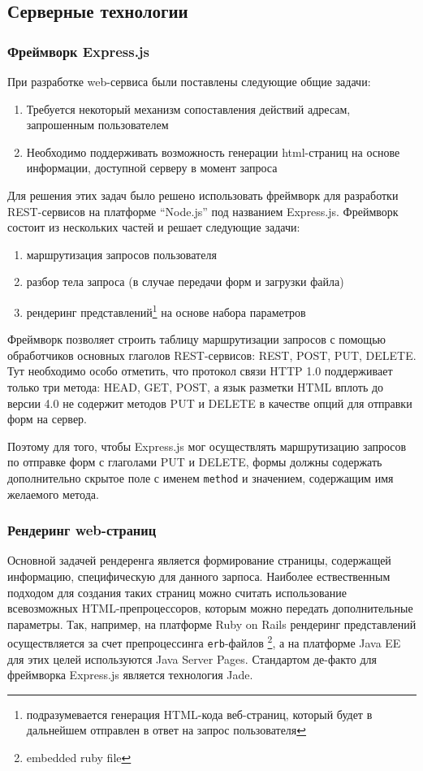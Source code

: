 \documentclass[12pt, a4paper]{article}
\begin{document}
\subsection{Серверные технологии}

\subsubsection{Фреймворк Express.js}
При разработке web-сервиса были поставлены следующие общие задачи:
\begin{enumerate}
    \item Требуется некоторый механизм сопоставления действий адресам, запрошенным
    пользователем
    \item Необходимо поддерживать возможность генерации html-страниц на основе
    информации, доступной серверу в момент запроса
\end{enumerate}

Для решения этих задач было решено использовать фреймворк для разработки
REST-сервисов на платформе ``Node.js'' под названием Express.js. Фреймворк состоит
из нескольких частей и решает следующие задачи:
\begin{enumerate}
    \item маршрутизация запросов пользователя
    \item разбор тела запроса (в случае передачи форм и загрузки файла)
    \item рендеринг представлений\footnote{подразумевается генерация HTML-кода
    веб-страниц, который будет в дальнейшем отправлен в ответ на запрос
    пользователя} на основе набора параметров
\end{enumerate}

Фреймворк позволяет строить таблицу маршрутизации запросов с помощью
обработчиков основных глаголов REST-сервисов: REST, POST, PUT, DELETE. Тут
необходимо особо отметить, что протокол связи HTTP 1.0 поддерживает только три
метода: HEAD, GET, POST, а язык разметки HTML вплоть до версии 4.0 не содержит
методов PUT и DELETE в качестве опций для отправки форм на сервер.

Поэтому для того, чтобы Express.js мог осуществлять маршрутизацию запросов по
отправке форм с глаголами PUT и DELETE, формы должны содержать дополнительно
скрытое поле с именем \texttt{method} и значением, содержащим имя желаемого
метода.

\subsubsection{Рендеринг web-страниц}
Основной задачей рендеренга является формирование страницы, содержащей
информацию, специфическую для данного зарпоса. Наиболее ествественным подходом
для создания таких страниц можно считать использование всевозможных
HTML-препроцессоров, которым можно передать дополнительные параметры.
Так, например, на платформе Ruby on Rails рендеринг представлений осуществляется
за счет препроцессинга \texttt{erb}-файлов \footnote{embedded ruby file}, а на
платформе Java EE для этих целей используются Java Server Pages. Стандартом
де-факто для фреймворка Express.js является технология Jade.
\end{document}
